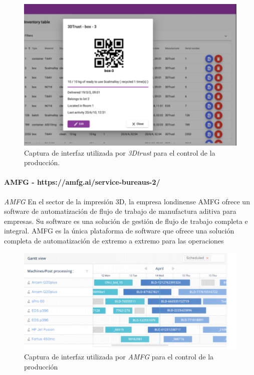 \begin{figure}[H]
\centering
\includegraphics[scale=1]{images/3dtmonitoreo3.png}
\caption{Captura de interfaz utilizada por \textit{3Dtrust} para el control de la producción.}
\label{3dtmonitoreo3}
\end{figure}

\paragraph{AMFG - https://amfg.ai/service-bureaus-2/}

\textit{AMFG} En el sector de la impresión 3D, la empresa londinense AMFG ofrece un software de automatización de flujo de trabajo de manufactura aditiva para empresas. Su software es una solución de gestión de flujo de trabajo completa e integral. AMFG es la única plataforma de software que ofrece una solución completa de automatización de extremo a extremo para las operaciones

\begin{figure}[H]
\centering
\includegraphics[scale=1]{images/amfg.png}
\caption{Captura de interfaz utilizada por \textit{AMFG} para el control de la producción}
\label{amfg}
\end{figure}


